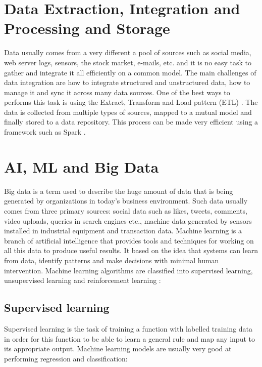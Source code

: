 \section{Data Extraction, Integration and Processing and Storage}
Data usually comes from a very different a pool of sources such as social media, web server logs, sensors, the stock market, e-mails, etc. and it is no easy task to gather and integrate it all efficiently on a common model. The main challenges of data integration are how to integrate structured and unstructured data, how to manage it and sync it across many data sources. One of the best ways to performs this task is using the Extract, Transform and Load pattern (ETL) \cite{feasibility}. The data is collected from multiple types of sources, mapped to a mutual model and finally stored to a data repository. This process can be made very efficient using a framework such as Spark \cite{spark}.



\newpage
\section{AI, ML and Big Data}
Big data is a term used to describe the huge amount of data that is being generated by organizations in today’s business environment. Such data usually comes from three primary sources: social data such as likes, tweets, comments, video uploads, queries in search engines etc., machine data generated by sensors installed in industrial equipment and transaction data. Machine learning is a branch of artificial intelligence that provides tools and techniques for working on all this data to produce useful results. It based on the idea that systems can learn from data, identify patterns and make decisions with minimal human intervention. Machine learning algorithms are classified into supervised learning, unsupervised learning and reinforcement learning \cite{marketingml}: 
 
\subsection{Supervised learning}

Supervised learning is the task of training a function with labelled training data in order for this function to be able to learn a general rule and map any input to its appropriate output. Machine learning models are usually very good at performing regression and classification:

